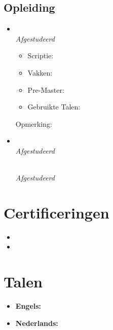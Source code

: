 \documentclass[11pt,a4paper]{article}
\begin{document}
\begin{itemize}[leftmargin=0pt,label={},itemsep=2em,topsep=0pt]
\begin{samepage}
\section{Opleiding}
\begin{itemize}[leftmargin=0pt,label={},itemsep=2em]
\item \parbox{\textwidth}{\textbf{\MasterUniversityNL} \hfill \textit{\MasterLocationNL}}\\
\textit{\MasterCourseNL} \hfill \textit{Afgestudeerd \MasterGraduationNL}\\[4pt]
\begin{itemize}[label={--},leftmargin=*,topsep=0pt,parsep=0pt,partopsep=0pt]
    \item {\color{secondary}Scriptie:} \textit{\MastersThesisTitleNL}\\
    \MastersThesisDescriptionNL
    \item {\color{secondary}Vakken:} \MastersCourseListNL
    \item {\color{secondary}Pre-Master:} \PreMastersCourseListNL
    \item {\color{secondary}Gebruikte Talen:} \MastersLanguagesNL
\end{itemize}
{Opmerking: \textit{\MastersNotableAchievementNL}}

\item \parbox{\textwidth}{\textbf{\BatchelorsUniversityNL} \hfill \textit{\BatchelorsLocationNL}}\\
\textit{\BatchelorsCourseNL} \hfill \textit{Afgestudeerd \BatchelorsGraduationNL}
\parbox{\textwidth}{\textbf{\HEAOHogeschoolNL} \hfill \textit{\HEAOsLocationNL}}\\
\textit{\HEAOCourseNL} \hfill \textit{Afgestudeerd \BatchelorsGraduationNL}
\end{itemize}
\end{samepage}


\section{Certificeringen}
\begin{itemize}[leftmargin=*]
\item \CertMicrosoftNL
\item \CertDutch
\end{itemize}

\section{Talen}
\begin{itemize}[leftmargin=*]
\item \textbf{Engels:} \LangEnglishNL
\item \textbf{Nederlands:} \LangDutchNL
\end{itemize} 


\end{itemize}
\end{document}
